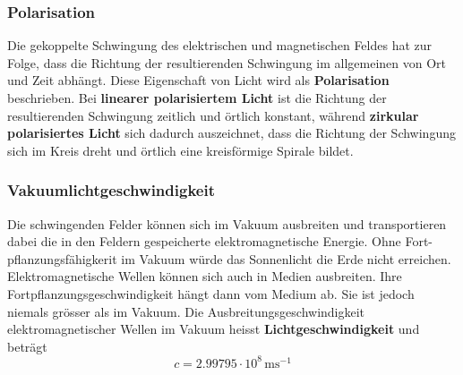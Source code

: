 \subsubsection{Polarisation}
Die gekoppelte Schwingung des elektrischen und magnetischen Feldes hat zur Folge, dass die Richtung der resultierenden Schwingung im allgemeinen von Ort und Zeit abhängt. Diese Eigenschaft von Licht wird als \textbf{Polarisation} beschrieben. Bei \textbf{linearer polarisiertem Licht} ist die Richtung der resultierenden Schwingung zeitlich und örtlich konstant, während \textbf{zirkular polarisiertes Licht} sich dadurch auszeichnet, dass die Richtung der Schwingung sich im Kreis dreht und örtlich eine kreisförmige Spirale bildet.
\subsubsection{Vakuumlichtgeschwindigkeit}
Die schwingenden Felder können sich im Vakuum ausbreiten und transportieren dabei die in den Feldern gespeicherte elektromagnetische Energie. Ohne Fort-pflanzungsfähigkerit im Vakuum würde das Sonnenlicht die Erde nicht erreichen. Elektromagnetische Wellen können sich auch in Medien ausbreiten. Ihre Fortpflanzungsgeschwindigkeit hängt dann vom Medium ab. Sie ist jedoch niemals grösser als im Vakuum. Die Ausbreitungsgeschwindigkeit elektromagnetischer Wellen im Vakuum heisst \textbf{Lichtgeschwindigkeit} und beträgt
\begin{equation}
\boxed{c=2.99795\cdot 10^{8}\,\text{ms}^{-1}}
\end{equation}
